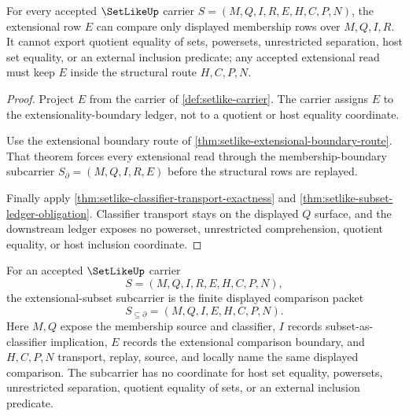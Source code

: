 \begin{theorem}
\label{thm:setlike-classifier-extensional-nonescape}
For every accepted $\SetLikeUp$ carrier $S=(M,Q,I,R,E,H,C,P,N)$, the extensional row $E$ can compare only displayed membership rows over $M,Q,I,R$. It cannot export quotient equality of sets, powersets, unrestricted separation, host set equality, or an external inclusion predicate; any accepted extensional read must keep $E$ inside the structural route $H,C,P,N$.
\end{theorem}
\begin{proof}
Project $E$ from the carrier of \autoref{def:setlike-carrier}. The carrier assigns $E$ to the extensionality-boundary ledger, not to a quotient or host equality coordinate.

Use the extensional boundary route of \autoref{thm:setlike-extensional-boundary-route}. That theorem forces every extensional read through the membership-boundary subcarrier $S_{\partial}=(M,Q,I,R,E)$ before the structural rows are replayed.

Finally apply \autoref{thm:setlike-classifier-transport-exactness} and \autoref{thm:setlike-subset-ledger-obligation}. Classifier transport stays on the displayed $Q$ surface, and the downstream ledger exposes no powerset, unrestricted comprehension, quotient equality, or host inclusion coordinate.
\end{proof}

\begin{definition}
\label{def:setlike-extensional-subset-carrier}
For an accepted $\SetLikeUp$ carrier
$$
S=(M,Q,I,R,E,H,C,P,N),
$$
the extensional-subset subcarrier is the finite displayed comparison packet
$$
S_{\subseteq\partial}=(M,Q,I,E,H,C,P,N).
$$
Here $M,Q$ expose the membership source and classifier, $I$ records subset-as-classifier implication, $E$ records the extensional comparison boundary, and $H,C,P,N$ transport, replay, source, and locally name the same displayed comparison. The subcarrier has no coordinate for host set equality, powersets, unrestricted separation, quotient equality of sets, or an external inclusion predicate.
\end{definition}

